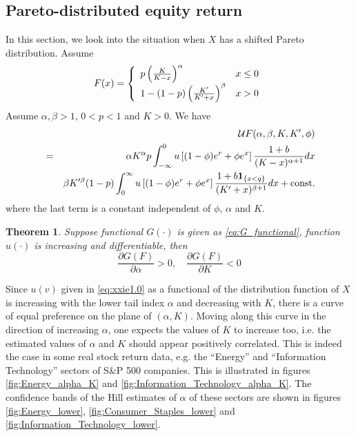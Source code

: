\documentclass{article}
\newcommand{\pd}[2]{
  \frac{\partial #1}{\partial #2}
}
\newcommand{\1}[1]{
  \mathbf{1}_{\{#1\}}
}
\newtheorem{theorem}{Theorem}
\begin{document}
\subsection{Pareto-distributed equity return}
In this section, we look into the situation when $X$ has a shifted
Pareto distribution. Assume
\begin{equation}
  \label{eq:X_distr}
  F(x) = \left\{
  \begin{array}{ll}
    p \left(
    {K \over K - x}
    \right)^\alpha & x \leq 0 \\
    1 - (1 - p) \left(
    {K' \over K' + x}
    \right)^\beta & x > 0
  \end{array}
  \right.
\end{equation}
Assume $\alpha, \beta > 1$, $0 < p < 1$ and $K > 0$.
We have
\begin{eqnarray}
  && \mathcal U F (\alpha, \beta, K, K', \phi) \nonumber \\
  &=&
  \alpha K^\alpha  p
  \int_{-\infty}^0
  u\left[ (1 - \phi) e^r + \phi e^x \right]
  {1 + b \over (K - x)^{\alpha + 1}} dx
  \nonumber \\
  &&
  \beta K'^\beta (1 - p)
  \int_{0}^\infty
  u\left[ (1 - \phi) e^r + \phi e^x \right]
  {1 + b \1{x < q} \over (K' + x)^{\beta + 1}} dx 
  + \text{const.}
  \label{eq:xxie1.0}
\end{eqnarray}
where the last term is a constant independent of $\phi$, $\alpha$ and $K$.
\begin{theorem}
  \label{thrm:I}
  Suppose functional $G(\cdot)$ is given as \eqref{eq:G_functional},
  function $u(\cdot)$ is increasing and differentiable, then
  \[
  \pd{G(F)}{\alpha} > 0,
  \quad
  \pd{G(F)}{K} < 0
  \]
\end{theorem}
Since $u(v)$ given in \eqref{eq:xxie1.0} as a
functional of the distribution function of $X$ is increasing with the
lower tail index $\alpha$ and decreasing with $K$, there is a curve of
equal preference on the plane of $(\alpha, K)$. Moving along this
curve in the direction of increasing $\alpha$, one expects the values
of $K$ to increase too, i.e. the estimated values of $\alpha$ and $K$
should appear positively correlated. This is indeed the case in some
real stock return data, e.g. the ``Energy'' and ``Information Technology''
sectors of S\&P 500 companies. This is illustrated in figures
\ref{fig:Energy_alpha_K} and \ref{fig:Information_Technology_alpha_K}.
The confidence bands of the Hill estimates of $\alpha$ of these
sectors are shown in figures \ref{fig:Energy_lower},
\ref{fig:Consumer_Staples_lower} and
\ref{fig:Information_Technology_lower}.
\end{document}
